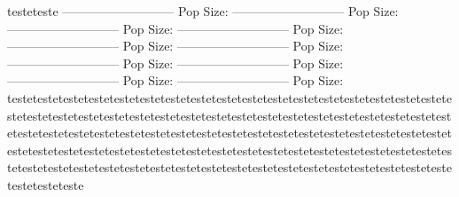 testeteste
---------------------------
Pop Size: 
---------------------------
Pop Size: 
---------------------------
Pop Size: 
---------------------------
Pop Size: 
---------------------------
Pop Size: 
---------------------------
Pop Size: 
---------------------------
Pop Size: 
---------------------------
Pop Size: 
---------------------------
Pop Size: 
---------------------------
Pop Size: testetestetestetestetestetestetestetestetestetestetestetestetestetestetestetestetestetestetestetestetestetestetestetestetestetestetestetestetestetestetestetestetestetestetestetestetestetestetestetestetestetestetestetestetestetestetestetestetestetestetestetestetestetestetestetestetestetestetestetestetestetestetestetestetestetestetestetestetestetestetestetestetestetestetestetestetestetestetestetestetestetestetestetestetestetestetestetestetesteteste